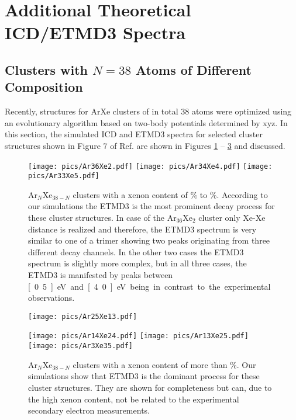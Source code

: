 \section{Additional Theoretical ICD/ETMD3 Spectra}

\subsection{Clusters with $N=38$ Atoms of Different Composition}
Recently, structures for ArXe clusters of in total 38 atoms were optimized
using an evolutionary algorithm based on two-body potentials determined
by xyz. \cite{marques}
In this section, the simulated ICD and ETMD3 spectra for selected cluster
structures shown in Figure 7 of Ref.  are shown in Figures
\ref{figure:ArXe_lt15} -- \ref{figure:ArXe_gt50} and discussed.


\begin{figure}
 \centering
 \texttt{[image: pics/Ar36Xe2.pdf]}
 \texttt{[image: pics/Ar34Xe4.pdf]}
 \texttt{[image: pics/Ar33Xe5.pdf]}
 \caption{Ar$_N$Xe$_{38-N}$ clusters with a xenon content of
          \unit[5]{\%} to \unit[13]{\%}.
          According to our simulations the ETMD3 is the most prominent decay
          process for these cluster structures.
          In case of the Ar$_{36}$Xe$_2$ cluster only Xe-Xe distance is
          realized and therefore, the ETMD3 spectrum is very similar
          to one of a trimer
          showing two peaks originating
          from three different decay channels. In the other two cases the ETMD3
          spectrum is slightly more complex, but in all three cases, the ETMD3
          is manifested by peaks between \unit[0.5]{eV} and \unit[4.0]{eV} being
          in contrast to the experimental observations.}
 \label{figure:ArXe_lt15}
\end{figure}

\begin{figure}
 \centering
 \texttt{[image: pics/Ar25Xe13.pdf]}
 \caption{}
 \label{}
\end{figure}

\begin{figure}
 \centering
 \texttt{[image: pics/Ar14Xe24.pdf]}
 \texttt{[image: pics/Ar13Xe25.pdf]}
 \texttt{[image: pics/Ar3Xe35.pdf]}
 \caption{Ar$_N$Xe$_{38-N}$ clusters with a xenon content of more
          than \unit[50]{\%}.
          Our simulations show that ETMD3 is the dominant process
          for these cluster structures.
          They are shown for completeness but can, due to the high xenon content,
          not be related to the experimental secondary electron measurements.}
 \label{figure:ArXe_gt50}
\end{figure}


